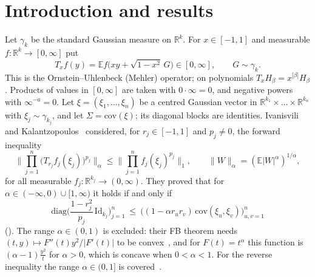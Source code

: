 \documentclass[11pt]{amsart}
\theoremstyle{definition}
\newcommand{\E}{\mathbb{E}}
\newcommand{\R}{\mathbb{R}}
\newcommand{\Id}{\mathrm{Id}}
\begin{document}
\makeatletter
\let\aidisc@setabstracta\@setabstracta
\def\@setabstracta{\par\vskip 10pt{\centering\small\itshape
This proof was generated on October 28, 2026, by Grok Bot using Cursor’s agents, guided by several prompts from Paata Ivanisvili
\par}\aidisc@setabstracta}
\makeatother
\maketitle

\section{Introduction and results}
Let $\gamma_k$ be the standard Gaussian measure on $\R^k$. For $x\in[-1,1]$ and measurable $f:\R^k\to[0,\infty]$ put
\[
T_xf(y)=\E f\big(xy+\sqrt{1-x^2}\,G\big)\in[0,\infty],\qquad G\sim\gamma_k .
\]
This is the Ornstein--Uhlenbeck (Mehler) operator; on polynomials $T_xH_\beta=x^{|\beta|}H_\beta$. Products of values
in $[0,\infty]$ are taken with $0\cdot\infty=0$, and negative powers with $\infty^{-a}=0$. Let
$\xi=(\xi_1,\dots,\xi_n)$ be a centred Gaussian vector in $\R^{k_1}\times\dots\times\R^{k_n}$ with $\xi_j\sim\gamma_{k_j}$,
and let $\Sigma=\mathrm{cov}(\xi)$; its diagonal blocks are identities. Ivanisvili and
Kalantzopoulos~\cite[Thm.~9]{IK25} considered, for $r_j\in[-1,1]$ and $p_j\ne0$, the forward inequality
\begin{equation}\label{eq:IK}
\Big\|\prod_{j=1}^n\big(T_{r_j}f_j(\xi_j)\big)^{p_j}\Big\|_{\alpha}\le\Big\|\prod_{j=1}^nf_j(\xi_j)^{p_j}\Big\|_1,
\qquad\|W\|_\alpha=(\E|W|^\alpha)^{1/\alpha},
\end{equation}
for all measurable $f_j:\R^{k_j}\to(0,\infty)$. They proved that for $\alpha\in(-\infty,0)\cup[1,\infty)$ it holds if
and only if
\begin{equation}\label{eq:IKcond}
\mathrm{diag}\Big(\frac{1-r_j^2}{p_j}\,\Id_{k_j}\Big)_{j=1}^n\ \le\ \big((1-\alpha r_ur_v)\,\mathrm{cov}(\xi_u,\xi_v)\big)_{u,v=1}^n
\end{equation}
(\cite[(2.16), (2.17)]{IK25}). The range $\alpha\in(0,1)$ is excluded: their FB theorem needs
$(t,y)\mapsto F''(t)y^2/|F'(t)|$ to be convex~\cite[(2.30)]{IK25}, and for $F(t)=t^\alpha$ this function is
$(\alpha-1)\frac{y^2}t$ for $\alpha>0$, which is concave when $0<\alpha<1$. For the reverse inequality the range
$\alpha\in(0,1]$ is covered~\cite[Thm.~9(ii)]{IK25}.
\end{document}
